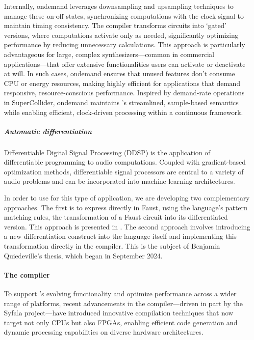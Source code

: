 Internally, ondemand leverages downsampling and upsampling techniques to manage these on-off states, synchronizing
computations with the clock signal to maintain timing consistency. The \F{} compiler transforms circuits into `gated'
versions, where computations activate only as needed, significantly optimizing performance by reducing unnecessary
calculations. This approach is particularly advantageous for large, complex synthesizers---common in commercial
applications---that offer extensive functionalities users can activate or deactivate at will. In such cases, ondemand
ensures that unused features don't consume CPU or energy resources, making \F{} highly efficient for applications that
demand responsive, resource-conscious performance. Inspired by demand-rate operations in SuperCollider, ondemand
maintains \F{}'s streamlined, sample-based semantics while enabling efficient, clock-driven processing within a
continuous framework.

\subparagraph{Automatic differentiation}

Differentiable Digital Signal Processing (DDSP) \cite{engel2020ddsp} is the application of differentiable programming to
audio computations. Coupled with gradient-based optimization methods, differentiable signal processors are central to a
variety of audio problems and can be incorporated into machine learning architectures.

In order to use \F{} for this type of application, we are developing two complementary approaches. The first is to
express directly in Faust, using the language's pattern matching rules, the transformation of a Faust circuit into its
differentiated version. This approach is presented in \cite{rushton:hal-04849619}. The second approach involves
introducing a new differentiation construct into the language itself and implementing this transformation directly in
the \F{} compiler. This is the subject of Benjamin Quiedeville's thesis, which began in September 2024.


\paragraph{The \F{} compiler}

To support \F{}'s evolving functionality and optimize performance across a wider range of platforms, recent advancements
in the \F{} compiler---driven in part by the Syfala project---have introduced innovative compilation techniques that now
target not only CPUs but also FPGAs, enabling efficient code generation and dynamic processing capabilities on diverse
hardware architectures.

